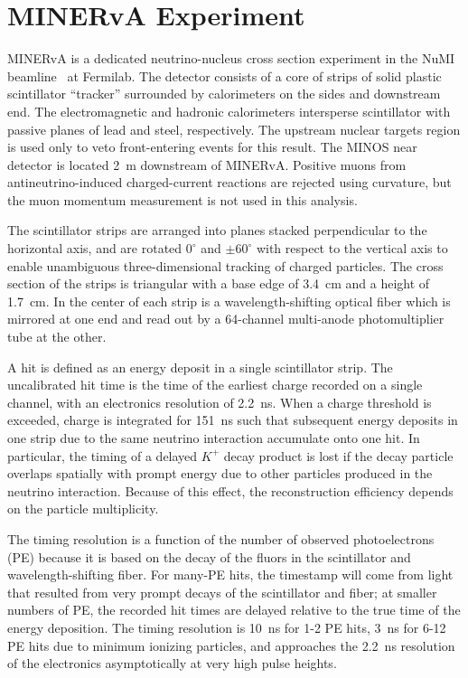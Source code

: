 \documentclass[aps,prl,preprint,showpacs,superscriptaddress,nofootinbib,floatfix,linenumbers]{revtex4}
\newcommand{\minerva}{MINERvA\xspace}
\newcommand{\kp}{\ensuremath{K^{+}}\xspace}
\begin{document}
\section{\minerva Experiment}
\label{sec:expt}

\minerva is a dedicated neutrino-nucleus cross section experiment in the NuMI beamline~\cite{numi} at Fermilab. The detector consists of a core of strips of solid plastic scintillator ``tracker'' surrounded by calorimeters on the sides and downstream end. The electromagnetic and hadronic calorimeters intersperse scintillator with passive planes of lead and steel, respectively. The upstream nuclear targets region is used only to veto front-entering events for this result. The MINOS near detector is located 2~m downstream of MINERvA. Positive muons from antineutrino-induced charged-current reactions are rejected using curvature, but the muon momentum measurement is not used in this analysis.

The scintillator strips are arranged into planes stacked perpendicular to the horizontal axis, and are rotated $0^{\circ}$ and $\pm60^{\circ}$ with respect to the vertical axis to enable unambiguous three-dimensional tracking of charged particles. The cross section of the strips is triangular with a base edge of 3.4~cm and a height of 1.7~cm. In the center of each strip is a wavelength-shifting optical fiber which is mirrored at one end and read out by a 64-channel multi-anode photomultiplier tube at the other.

A hit is defined as an energy deposit in a single scintillator strip. The uncalibrated hit time is the time of the earliest charge recorded on a single channel, with an electronics resolution of 2.2~ns. When a charge threshold is exceeded, charge is integrated for 151~ns such that subsequent energy deposits in one strip due to the same neutrino interaction accumulate onto one hit. In particular, the timing of a delayed \kp decay product is lost if the decay particle overlaps spatially with prompt energy due to other particles produced in the neutrino interaction. Because of this effect, the reconstruction efficiency depends on the particle multiplicity.

The timing resolution is a function of the number of observed photoelectrons (PE) because it is based on the decay of the fluors in the scintillator and wavelength-shifting fiber. For many-PE hits, the timestamp will come from light that resulted from very prompt decays of the scintillator and fiber; at smaller numbers of PE, the recorded hit times are delayed relative to the true time of the energy deposition. The timing resolution is 10~ns for 1-2 PE hits, 3~ns for 6-12 PE hits due to minimum ionizing particles, and approaches the 2.2~ns resolution of the electronics asymptotically at very high pulse heights.
\end{document}
